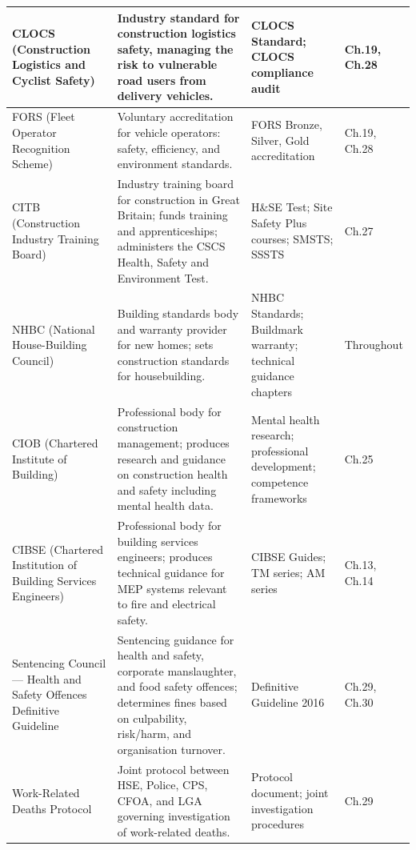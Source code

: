 \begin{table}[H]
\begin{tabularx}{\textwidth}{>{\raggedright\arraybackslash}p{3.0cm}>{\raggedright\arraybackslash}p{4.5cm}>{\raggedright\arraybackslash}p{3.0cm}>{\raggedright\arraybackslash}X}
\midrule
CLOCS (Construction Logistics and Cyclist Safety) & Industry standard for construction logistics safety, managing the risk to vulnerable road users from delivery vehicles. & CLOCS Standard; CLOCS compliance audit & Ch.19, Ch.28 \\
\midrule
FORS (Fleet Operator Recognition Scheme) & Voluntary accreditation for vehicle operators: safety, efficiency, and environment standards. & FORS Bronze, Silver, Gold accreditation & Ch.19, Ch.28 \\
\midrule
CITB (Construction Industry Training Board) & Industry training board for construction in Great Britain; funds training and apprenticeships; administers the CSCS Health, Safety and Environment Test. & H\&SE Test; Site Safety Plus courses; SMSTS; SSSTS & Ch.27 \\
\midrule
NHBC (National House-Building Council) & Building standards body and warranty provider for new homes; sets construction standards for housebuilding. & NHBC Standards; Buildmark warranty; technical guidance chapters & Throughout \\
\midrule
CIOB (Chartered Institute of Building) & Professional body for construction management; produces research and guidance on construction health and safety including mental health data. & Mental health research; professional development; competence frameworks & Ch.25 \\
\midrule
CIBSE (Chartered Institution of Building Services Engineers) & Professional body for building services engineers; produces technical guidance for MEP systems relevant to fire and electrical safety. & CIBSE Guides; TM series; AM series & Ch.13, Ch.14 \\
\midrule
Sentencing Council --- Health and Safety Offences Definitive Guideline & Sentencing guidance for health and safety, corporate manslaughter, and food safety offences; determines fines based on culpability, risk/harm, and organisation turnover. & Definitive Guideline 2016 & Ch.29, Ch.30 \\
\midrule
Work-Related Deaths Protocol & Joint protocol between HSE, Police, CPS, CFOA, and LGA governing investigation of work-related deaths. & Protocol document; joint investigation procedures & Ch.29 \\
\bottomrule
\end{tabularx}
\end{table}
